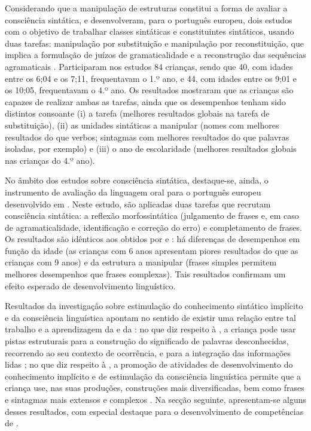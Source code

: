 \documentclass[output=paper]{LSP/langsci}
\begin{document}
Considerando que a manipulação de estruturas constitui a forma de avaliar a consciência sintática, \citet{alexandre2010} e \citet{costa2010} desenvolveram, para o português europeu, dois estudos com o objetivo de trabalhar classes sintáticas e constituintes sintáticos, usando duas tarefas: manipulação por substituição \citep{alexandre2010} e manipulação por reconstituição, que implica a formulação de juízos de gramaticalidade e a reconstrução das sequências agramaticais \citep{costa2010}. Participaram nos estudos 84 crianças, sendo que 40, com idades entre os 6;04 e os 7;11, frequentavam o 1.º ano, e 44, com idades entre os 9;01 e os 10;05, frequentavam o 4.º ano. Os resultados mostraram que as crianças são capazes de realizar ambas as tarefas, ainda que os desempenhos tenham sido distintos consoante (i) a tarefa (melhores resultados globais na tarefa de substituição), (ii) as unidades sintáticas a manipular (nomes com melhores resultados do que verbos; sintagmas com melhores resultados do que palavras isoladas, por exemplo) e (iii) o ano de escolaridade (melhores resultados globais nas crianças do 4.º ano).

No âmbito dos estudos sobre consciência sintática, destaque-se, ainda, o instrumento de avaliação da linguagem oral para o português europeu desenvolvido em \citet{simsim1997}. Neste estudo, são aplicadas duas tarefas que recrutam consciência sintática: a reflexão morfossintática (julgamento de frases e, em caso de agramaticalidade, identificação e correção do erro) e completamento de frases. Os resultados são idênticos aos obtidos por \citet{alexandre2010} e \citet{costa2010}: há diferenças de desempenhos em função da idade (as crianças com 6 anos apresentam piores resultados do que as crianças com 9 anos) e da estrutura a manipular (frases simples permitem melhores desempenhos que frases complexas). Tais resultados confirmam um efeito esperado de desenvolvimento linguístico.

Resultados da investigação sobre estimulação do conhecimento sintático implícito e da consciência linguística apontam no sentido de existir uma relação entre tal trabalho e a aprendizagem da  e da : no que diz respeito à , a criança pode usar pistas estruturais para a construção do significado de palavras desconhecidas, recorrendo ao seu contexto de ocorrência, e para a integração das informações lidas \citep{tunmer1990}; no que diz respeito à , a promoção de atividades de desenvolvimento do conhecimento implícito e de estimulação da consciência linguística permite que a criança use, nas suas produções, construções mais diversificadas, bem como frases e sintagmas mais extensos e complexos \citep{barbeiro1994,alcosta2010}. Na secção seguinte, apresentam-se alguns desses resultados, com especial destaque para o desenvolvimento de competências de .
\end{document}
